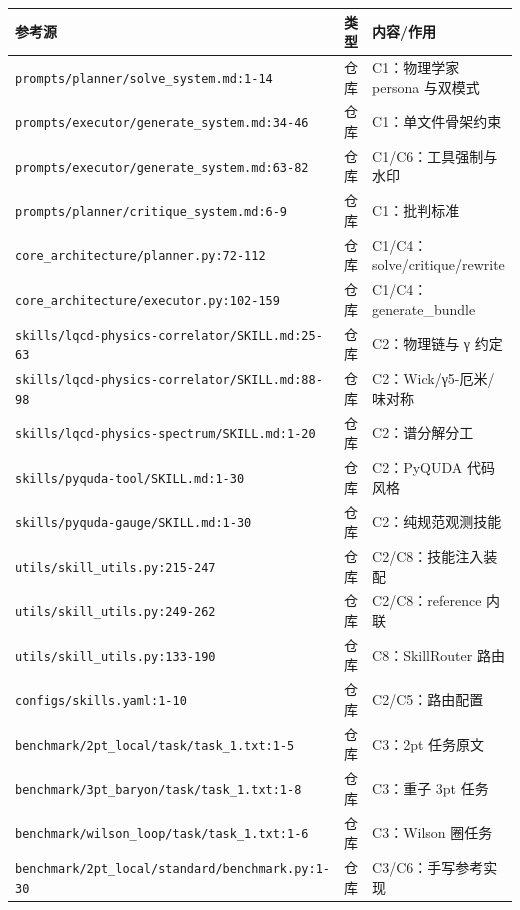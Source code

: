 \documentclass[UTF8]{ctexart}
\begin{document}
\begin{xltabular}{\textwidth}{XlX}
\toprule
\textcolor{evidence}{参考源} & 类型 & 内容/作用 \\
\midrule
\endhead
\texttt{\nolinkurl{prompts/planner/solve_system.md:1-14}} & 仓库 & C1：物理学家 persona 与双模式 \\
\texttt{\nolinkurl{prompts/executor/generate_system.md:34-46}} & 仓库 & C1：单文件骨架约束 \\
\texttt{\nolinkurl{prompts/executor/generate_system.md:63-82}} & 仓库 & C1/C6：工具强制与水印 \\
\texttt{\nolinkurl{prompts/planner/critique_system.md:6-9}} & 仓库 & C1：批判标准 \\
\texttt{\nolinkurl{core_architecture/planner.py:72-112}} & 仓库 & C1/C4：solve/critique/rewrite \\
\texttt{\nolinkurl{core_architecture/executor.py:102-159}} & 仓库 & C1/C4：generate\_bundle \\
\texttt{\nolinkurl{skills/lqcd-physics-correlator/SKILL.md:25-63}} & 仓库 & C2：物理链与 γ 约定 \\
\texttt{\nolinkurl{skills/lqcd-physics-correlator/SKILL.md:88-98}} & 仓库 & C2：Wick/γ5-厄米/味对称 \\
\texttt{\nolinkurl{skills/lqcd-physics-spectrum/SKILL.md:1-20}} & 仓库 & C2：谱分解分工 \\
\texttt{\nolinkurl{skills/pyquda-tool/SKILL.md:1-30}} & 仓库 & C2：PyQUDA 代码风格 \\
\texttt{\nolinkurl{skills/pyquda-gauge/SKILL.md:1-30}} & 仓库 & C2：纯规范观测技能 \\
\texttt{\nolinkurl{utils/skill_utils.py:215-247}} & 仓库 & C2/C8：技能注入装配 \\
\texttt{\nolinkurl{utils/skill_utils.py:249-262}} & 仓库 & C2/C8：reference 内联 \\
\texttt{\nolinkurl{utils/skill_utils.py:133-190}} & 仓库 & C8：SkillRouter 路由 \\
\texttt{\nolinkurl{configs/skills.yaml:1-10}} & 仓库 & C2/C5：路由配置 \\
\texttt{\nolinkurl{benchmark/2pt_local/task/task_1.txt:1-5}} & 仓库 & C3：2pt 任务原文 \\
\texttt{\nolinkurl{benchmark/3pt_baryon/task/task_1.txt:1-8}} & 仓库 & C3：重子 3pt 任务 \\
\texttt{\nolinkurl{benchmark/wilson_loop/task/task_1.txt:1-6}} & 仓库 & C3：Wilson 圈任务 \\
\texttt{\nolinkurl{benchmark/2pt_local/standard/benchmark.py:1-30}} & 仓库 & C3/C6：手写参考实现 \\

\end{xltabular}
\end{document}
